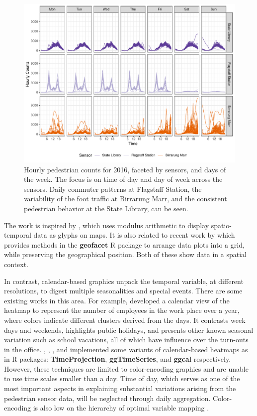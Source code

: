 \documentclass[12pt]{article}
\begin{document}
\begin{figure}

{\centering \includegraphics[width=\textwidth]{figure/facet-time-1} 

}

\caption{Hourly pedestrian counts for 2016, faceted by sensors, and days of the week. The focus is on time of day and day of week across the sensors. Daily commuter patterns at Flagstaff Station, the variability of the foot traffic at Birrarung Marr, and the consistent pedestrian behavior at the State Library, can be seen.}\label{fig:facet-time}
\end{figure}



The work is inspired by \citet{Wickham2012glyph}, which uses modulus arithmetic to display spatio-temporal data as glyphs on maps. It is also related to recent work by \citet{R-geofacet} which provides methods in the \textbf{geofacet} R package to arrange data plots into a grid, while preserving the geographical position. Both of these show data in a spatial context.

In contrast, calendar-based graphics unpack the temporal variable, at different resolutions, to digest multiple seasonalities and special events. There are some existing works in this area. For example, \citet{VanWijkCluster1999} developed a calendar view of the heatmap to represent the number of employees in the work place over a year, where colors indicate different clusters derived from the days. It contrasts week days and weekends, highlights public holidays, and presents other known seasonal variation such as school vacations, all of which have influence over the turn-outs in the office. \citet{Jones-heatmap}, \citet{R-TimeProjection}, \citet{R-ggTimeSeries}, and \citet{R-ggcal} implemented some variants of calendar-based heatmaps as in R packages: \textbf{TimeProjection}, \textbf{ggTimeSeries}, and \textbf{ggcal} respectively. However, these techniques are limited to color-encoding graphics and are unable to use time scales smaller than a day. Time of day, which serves as one of the most important aspects in explaining substantial variations arising from the pedestrian sensor data, will be neglected through daily aggregation. Color-encoding is also low on the hierarchy of optimal variable mapping \citep{cleveland1984graphical, lam2007overview}.
\end{document}
